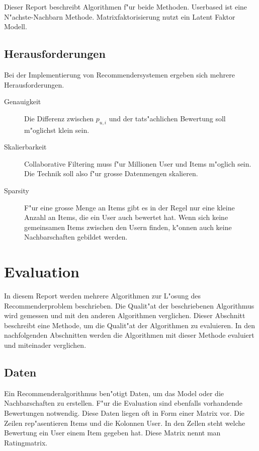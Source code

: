 \documentclass[a4paper, 12pt]{article}
\begin{document}
Dieser Report beschreibt Algorithmen f"ur beide Methoden. Userbased ist eine N"achste-Nachbarn Methode. Matrixfaktorisierung nutzt ein Latent Faktor Modell.

\subsection{Herausforderungen}
\label{sec:challenges}

Bei der Implementierung von Recommendersystemen ergeben sich mehrere Herausforderungen.

\begin{description}
\item[Genauigkeit]  Die Differenz zwischen $p_{u,i}$ und der tats"achlichen Bewertung soll m"oglichst klein sein.
\item[Skalierbarkeit] 
Collaborative Filtering muss f"ur Millionen User und Items m"oglich sein. Die Technik soll also f"ur grosse Datenmengen skalieren.
\item[Sparsity] F"ur eine grosse Menge an Items gibt es in der Regel nur eine kleine Anzahl an Items, die ein User auch bewertet hat. Wenn sich keine gemeinsamen Items zwischen den Usern finden, k"onnen auch keine Nachbarschaften gebildet werden.
\end{description}

\section{Evaluation}
\label{sec:evaluation}

In diesem Report werden mehrere Algorithmen zur L"osung des Recommenderproblem beschrieben. Die Qualit"at der beschriebenen Algorithmus wird gemessen und mit den anderen Algorithmen verglichen. Dieser Abschnitt beschreibt eine Methode, um die Qualit"at der Algorithmen zu evaluieren. In den nachfolgenden Abschnitten werden die Algorithmen mit dieser Methode evaluiert und miteinader verglichen.

\subsection{Daten}
\label{sec:data}

Ein Recommenderalgorithmus ben"otigt Daten, um das Model oder die Nachbarschaften zu erstellen. F"ur die Evaluation sind ebenfalls vorhandende Bewertungen notwendig. Diese Daten liegen oft in Form einer Matrix vor. Die Zeilen rep"asentieren Items und die Kolonnen User. In den Zellen steht welche Bewertung ein User einem Item gegeben hat. Diese Matrix nennt man Ratingmatrix.
\end{document}
